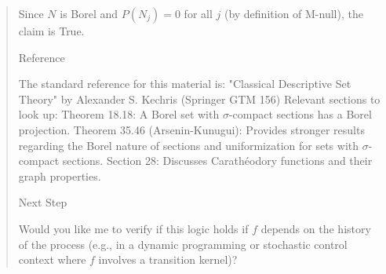 \begin{Rem}
{\begin{quote}
Since $N$ is Borel and $P(N_j) = 0$ for all $j$ (by definition of M-null), the claim is True.

Reference

The standard reference for this material is:
"Classical Descriptive Set Theory" by Alexander S. Kechris (Springer GTM 156)
Relevant sections to look up:
Theorem 18.18: A Borel set with $\sigma$-compact sections has a Borel projection.
Theorem 35.46 (Arsenin-Kunugui): Provides stronger results regarding the Borel nature of sections and uniformization for sets with $\sigma$-compact sections.
Section 28: Discusses Carathéodory functions and their graph properties.

Next Step

Would you like me to verify if this logic holds if $f$ depends on the history of the process (e.g., in a dynamic programming or stochastic control context where $f$ involves a transition kernel)?
    \end{quote}
  }
\end{Rem}

